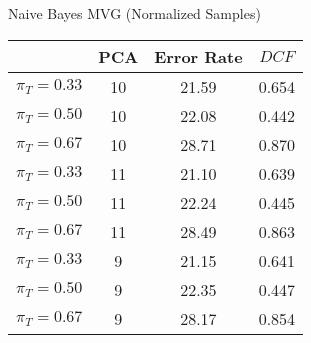\caption{Naive Bayes MVG (Normalized Samples)}\label{tab:mvgn_naiveacctable}
\begin{center}
\begin{tabular}{|c|c||c|c|}
\hline
\ & PCA & Error Rate & $DCF$\\
\hline
$\pi_T = 0.33$ & 10 & 21.59 & 0.654 \\
$\pi_T = 0.50$ & 10 & 22.08 & 0.442 \\
$\pi_T = 0.67$ & 10 & 28.71 & 0.870 \\
\hline
$\pi_T = 0.33$ & 11 & 21.10 & 0.639 \\
$\pi_T = 0.50$ & 11 & 22.24 & 0.445 \\
$\pi_T = 0.67$ & 11 & 28.49 & 0.863 \\
\hline
$\pi_T = 0.33$ & 9 & 21.15 & 0.641 \\
$\pi_T = 0.50$ & 9 & 22.35 & 0.447 \\
$\pi_T = 0.67$ & 9 & 28.17 & 0.854 \\
\hline
\end{tabular}
\end{center}

